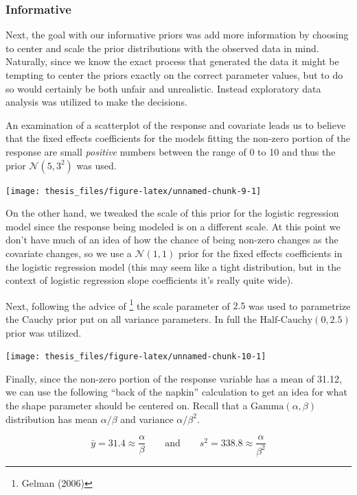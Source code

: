 \documentclass[12pt,twoside]{reedthesis}
\begin{document}
\hypertarget{info}{%
\subsubsection{Informative}\label{info}}

Next, the goal with our informative priors was add more information by choosing to center and scale the prior distributions with the observed data in mind. Naturally, since we know the exact process that generated the data it might be tempting to center the priors exactly on the correct parameter values, but to do so would certainly be both unfair and unrealistic. Instead exploratory data analysis was utilized to make the decisions.

An examination of a scatterplot of the response and covariate leads us to believe that the fixed effects coefficients for the models fitting the non-zero portion of the response are small \emph{positive} numbers between the range of 0 to 10 and thus the prior \(\mathcal{N}(5, 3^2)\) was used.
\begin{center}\texttt{[image: thesis\_files/figure-latex/unnamed-chunk-9-1]} \end{center}

On the other hand, we tweaked the scale of this prior for the logistic regression model since the response being modeled is on a different scale. At this point we don't have much of an idea of how the chance of being non-zero changes as the covariate changes, so we use a \(\mathcal{N}(1,1)\) prior for the fixed effects coefficients in the logistic regression model (this may seem like a tight distribution, but in the context of logistic regression slope coefficients it's really quite wide).

Next, following the advice of \footnote{Gelman (2006)} the scale parameter of \(2.5\) was used to parametrize the Cauchy prior put on all variance parameters. In full the \(\text{Half-Cauchy}(0, 2.5)\) prior was utilized.
\begin{center}\texttt{[image: thesis\_files/figure-latex/unnamed-chunk-10-1]} \end{center}

Finally, since the non-zero portion of the response variable has a mean of 31.12, we can use the following ``back of the napkin'' calculation to get an idea for what the shape parameter should be centered on. Recall that a \(\text{Gamma}(\alpha, \beta)\) distribution has mean \(\alpha / \beta\) and variance \(\alpha / \beta^2\).

\[
\bar{y} = 31.4 \approx \frac{\alpha}{\beta}\qquad \text{and} \qquad s^2 = 338.8 \approx \frac{\alpha}{\beta^2}
\]
\end{document}
